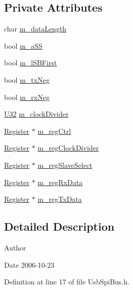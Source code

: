 \subsection*{Private Attributes}
\begin{DoxyCompactItemize}
\item 
char \hyperlink{classUsbSpiBus_a2d8b2bddd6d4d5dc53c38b5698737c5c}{m\_\-dataLength}
\item 
bool \hyperlink{classUsbSpiBus_ac98d088ac8aed042f65cbd918fc538ae}{m\_\-aSS}
\item 
bool \hyperlink{classUsbSpiBus_a23011787b0425356b011bc7a1c7cff5b}{m\_\-lSBFirst}
\item 
bool \hyperlink{classUsbSpiBus_a48528e7dcb036ecc1732581a89e16d10}{m\_\-txNeg}
\item 
bool \hyperlink{classUsbSpiBus_abf36f2df24c3ec5363efe73c9771bbc8}{m\_\-rxNeg}
\item 
\hyperlink{classUsbSpiBus_a9b24e28662a35ca57f5ed32c41c5f3ff}{U32} \hyperlink{classUsbSpiBus_a5a4de2b61018f52b885559ce07bd3161}{m\_\-clockDivider}
\item 
\hyperlink{classRegister}{Register} $\ast$ \hyperlink{classUsbSpiBus_abcd2ac59f2bb4ea5b97ff98f2b7659da}{m\_\-regCtrl}
\item 
\hyperlink{classRegister}{Register} $\ast$ \hyperlink{classUsbSpiBus_abfd5f040a0a8c19d972b26ea581bf1f0}{m\_\-regClockDivider}
\item 
\hyperlink{classRegister}{Register} $\ast$ \hyperlink{classUsbSpiBus_a5cdebdc06a79322c0802fbc523cade91}{m\_\-regSlaveSelect}
\item 
\hyperlink{classRegister}{Register} $\ast$ \hyperlink{classUsbSpiBus_ab59fb8ae67f97818d8cc6e0daf324cf6}{m\_\-regRxData}
\item 
\hyperlink{classRegister}{Register} $\ast$ \hyperlink{classUsbSpiBus_ae4b9ec4d035b9a507735b28dba04556c}{m\_\-regTxData}
\end{DoxyCompactItemize}


\subsection{Detailed Description}
\begin{DoxyAuthor}{Author}

\end{DoxyAuthor}
\begin{DoxyDate}{Date}
2006-\/10-\/23 
\end{DoxyDate}


Definition at line 17 of file UsbSpiBus.h.

